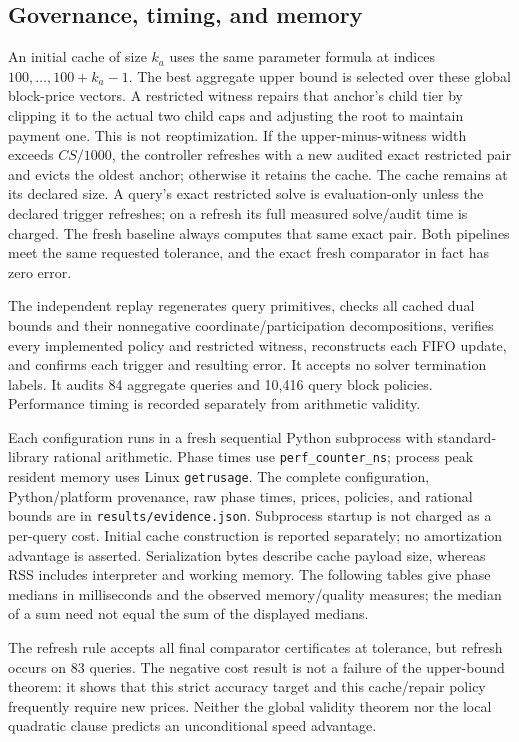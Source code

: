 \subsection{Governance, timing, and memory}
An initial cache of size $k_a$ uses the same parameter formula at indices $100,\ldots,100+k_a-1$. The best aggregate upper bound is selected over these global block-price vectors. A restricted witness repairs that anchor's child tier by clipping it to the actual two child caps and adjusting the root to maintain payment one. This is not reoptimization. If the upper-minus-witness width exceeds $CS/1000$, the controller refreshes with a new audited exact restricted pair and evicts the oldest anchor; otherwise it retains the cache. The cache remains at its declared size. A query's exact restricted solve is evaluation-only unless the declared trigger refreshes; on a refresh its full measured solve/audit time is charged. The fresh baseline always computes that same exact pair. Both pipelines meet the same requested tolerance, and the exact fresh comparator in fact has zero error.

The independent replay regenerates query primitives, checks all cached dual bounds and their nonnegative coordinate/participation decompositions, verifies every implemented policy and restricted witness, reconstructs each FIFO update, and confirms each trigger and resulting error. It accepts no solver termination labels. It audits 84 aggregate queries and 10,416 query block policies. Performance timing is recorded separately from arithmetic validity.

Each configuration runs in a fresh sequential Python subprocess with standard-library rational arithmetic. Phase times use \texttt{perf\_counter\_ns}; process peak resident memory uses Linux \texttt{getrusage}. The complete configuration, Python/platform provenance, raw phase times, prices, policies, and rational bounds are in \texttt{results/evidence.json}. Subprocess startup is not charged as a per-query cost. Initial cache construction is reported separately; no amortization advantage is asserted. Serialization bytes describe cache payload size, whereas RSS includes interpreter and working memory. The following tables give phase medians in milliseconds and the observed memory/quality measures; the median of a sum need not equal the sum of the displayed medians.

The refresh rule accepts all final comparator certificates at tolerance, but refresh occurs on 83 queries. The negative cost result is not a failure of the upper-bound theorem: it shows that this strict accuracy target and this cache/repair policy frequently require new prices. Neither the global validity theorem nor the local quadratic clause predicts an unconditional speed advantage.
